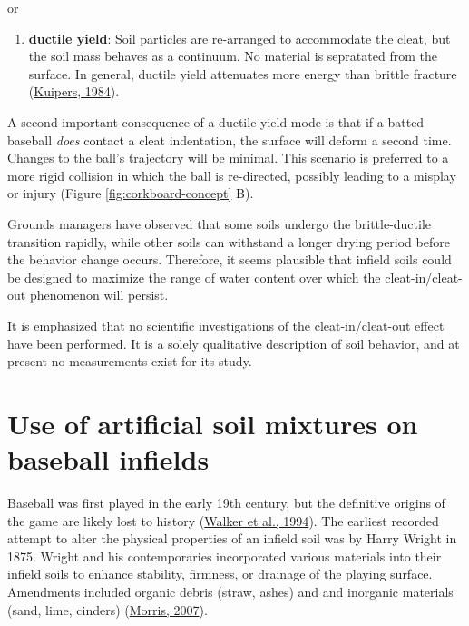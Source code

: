 \documentclass[
  letterpaper,
  openany]{book}
\providecommand{\tightlist}{%
  \setlength{\itemsep}{0pt}\setlength{\parskip}{0pt}}
\begin{document}
or

\begin{enumerate}
\def\labelenumi{\arabic{enumi}.}
\setcounter{enumi}{1}
\tightlist
\item
  \textbf{ductile yield}: Soil particles are re-arranged to accommodate the cleat, but the soil mass behaves as a continuum.
  No material is sepratated from the surface.
  In general, ductile yield attenuates more energy than brittle fracture (\protect\hyperlink{ref-Kuipers1984}{Kuipers, 1984}).
\end{enumerate}

A second important consequence of a ductile yield mode is that if a batted baseball \emph{does} contact a cleat indentation, the surface will deform a second time. Changes to the ball's trajectory will be minimal.
This scenario is preferred to a more rigid collision in which the ball is re-directed, possibly leading to a misplay or injury (Figure \ref{fig:corkboard-concept} B).

Grounds managers have observed that some soils undergo the brittle-ductile transition rapidly, while other soils can withstand a longer drying period before the behavior change occurs.
Therefore, it seems plausible that infield soils could be designed to maximize the range of water content over which the cleat-in/cleat-out phenomenon will persist.

It is emphasized that no scientific investigations of the cleat-in/cleat-out effect have been performed.
It is a solely qualitative description of soil behavior, and at present no measurements exist for its study.

\hypertarget{use-of-artificial-soil-mixtures-on-baseball-infields}{%
\section{Use of artificial soil mixtures on baseball infields}\label{use-of-artificial-soil-mixtures-on-baseball-infields}}

Baseball was first played in the early 19th century, but the definitive origins of the game are likely lost to history (\protect\hyperlink{ref-Walker1994}{Walker et al., 1994}).
The earliest recorded attempt to alter the physical properties of an infield soil was by Harry Wright in 1875.
Wright and his contemporaries incorporated various materials into their infield soils to enhance stability, firmness, or drainage of the playing surface.
Amendments included organic debris (straw, ashes) and and inorganic materials (sand, lime, cinders) (\protect\hyperlink{ref-Morris2007}{Morris, 2007}).
\end{document}
